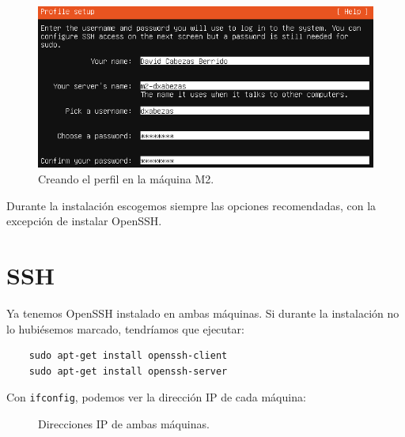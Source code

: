 \documentclass{article}
\begin{document}
\begin{figure}[H]
	\centering
	\includegraphics[width=160mm]{imgs/perfil}
	\caption{Creando el perfil en la máquina M2.}
	\label{fig:perfil}
\end{figure}

Durante la instalación escogemos siempre las opciones recomendadas, con la excepción de instalar OpenSSH.

\section{SSH}

Ya tenemos OpenSSH instalado en ambas máquinas. Si durante la instalación no lo hubiésemos marcado, tendríamos que ejecutar:

\begin{verbatim}
	sudo apt-get install openssh-client
	sudo apt-get install openssh-server
\end{verbatim}

Con \texttt{ifconfig}, podemos ver la dirección IP de cada máquina:

\begin{figure}[H]
	\centering
	\caption{Direcciones IP de ambas máquinas.}
	\label{fig:ifconfig}
\end{figure}
\end{document}
